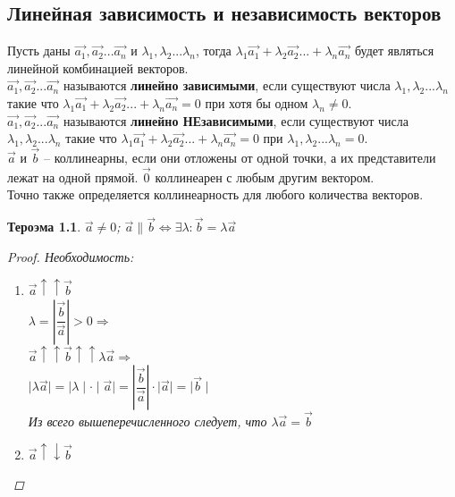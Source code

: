 \documentclass[oneside]{book}
\newtheorem{thm}{Тероэма}[chapter] %
\begin{document}
\begin{enumerate}
\begin{itemize}
\begin{enumerate}
\setcounter{chapter}{40}
\chapter{Линейная зависимость и независимость векторов}
Пусть даны $\vec{a_{1}},\vec{a_{2}}...\vec{a_{n}}$ и $\lambda_{1},\lambda_{2}...\lambda_{n}$, тогда $\lambda_{1}\vec{a_{1}}+\lambda_{2}\vec{a_{2}}...+\lambda_{n}\vec{a_{n}}$ будет являться линейной комбинацией векторов.\\
$\vec{a_{1}},\vec{a_{2}}...\vec{a_{n}}$ называются \textbf{линейно зависимыми}, если существуют числа $\lambda_{1},\lambda_{2}...\lambda_{n}$ такие что $\lambda_{1}\vec{a_{1}}+\lambda_{2}\vec{a_{2}}...+\lambda_{n}\vec{a_{n}}=0$ при хотя бы одном $\lambda_{n}\ne 0$.\\
$\vec{a_{1}},\vec{a_{2}}...\vec{a_{n}}$ называются \textbf{линейно НЕзависимыми}, если существуют числа $\lambda_{1},\lambda_{2}...\lambda_{n}$ такие что $\lambda_{1}\vec{a_{1}}+\lambda_{2}\vec{a_{2}}...+\lambda_{n}\vec{a_{n}}=0$ при $\lambda_{1},\lambda_{2}...\lambda_{n}=0$.\\
$\vec{a}$ и $\vec{b}$ -- коллинеарны, если они отложены от одной точки, а их представители лежат на одной прямой. $\vec{0}$ коллинеарен с любым другим вектором.\\
Точно также определяется коллинеарность для любого количества векторов.\\
\begin{thm}
    $\vec{a}\ne 0$; $\vec{a}\parallel \vec{b} \Leftrightarrow \exists \lambda: \vec{b} = \lambda \vec{a}$
    \begin{proof} 
      \par Необходимость: 
      \begin{enumerate}
        \item $\vec{a} \uparrow \uparrow \vec{b}$\\
        $\lambda = \left| \dfrac{\vec{b}}{\vec{a}}\right|>0 \Longrightarrow $\\
        $\vec{a} \uparrow \uparrow \vec{b} \uparrow \uparrow \lambda\vec{a} \Longrightarrow$\\
        $\mid \lambda\vec{a} \mid = \mid \lambda \mid \cdot \mid \vec{a} \mid = 
        \left| \dfrac{\vec{b}}{\vec{a}}\right| \cdot \mid \vec{a} \mid = \mid \vec{b} \mid$\\
        Из всего вышеперечисленного следует, что $\lambda\vec{a}=\vec{b}$
        \item $\vec{a} \uparrow \downarrow \vec{b}$\\

\end{enumerate}
\end{proof}
\end{thm}
\end{enumerate}
\end{itemize}
\end{enumerate}
\end{document}
